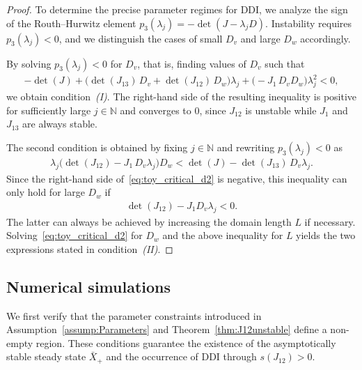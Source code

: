 \documentclass[12pt, a4paper]{amsart}
\numberwithin{equation}{section}
\newcommand{\CSS}{\bar{X}}
\begin{document}
\begin{proof}
    To determine the precise parameter regimes for DDI, we analyze the sign of the Routh--Hurwitz element $p_3(\lambda_j) = - \det(J - \lambda_j D)$. Instability requires $p_3(\lambda_j)<0$, and we distinguish the cases of small $D_v$ and large $D_w$ accordingly.
    
    By solving $p_3(\lambda_j) < 0$ for $D_v$, that is, finding values of $D_v$ such that
    \begin{align}
    -\det(J) + \biggl( \det(J_{13})\,D_v + \det(J_{12}) \,D_w \biggr) \lambda_j + \biggl( -J_1\, D_v D_w \biggr) \lambda_j^2 < 0,
    \end{align}
    we obtain condition~\emph{(I)}.  
    The right-hand side of the resulting inequality is positive for sufficiently large $j \in \mathbb{N}$ and converges to $0$, since $J_{12}$ is unstable while $J_1$ and $J_{13}$ are always stable.

    The second condition is obtained by fixing $j \in \mathbb{N}$ and rewriting $p_3(\lambda_j) < 0$ as
    \begin{align}
    \label{eq:toy_critical_d2}
        \lambda_j \big( \det(J_{12}) - J_1\, D_v \lambda_j \big) D_w 
        < \det(J) - \det(J_{13})\,D_v \lambda_j.
    \end{align}
    Since the right-hand side of~\eqref{eq:toy_critical_d2} is negative, this inequality can only hold for large $D_w$ if
    \begin{align}
        \det(J_{12}) - J_1 D_v \lambda_j < 0.
    \end{align}
    The latter can always be achieved by increasing the domain length $L$ if necessary. 
    Solving~\eqref{eq:toy_critical_d2} for $D_w$ and the above inequality for $L$ yields the two expressions stated in condition~\emph{(II)}.
\end{proof}

\subsection{Numerical simulations}
We first verify that the parameter constraints introduced in Assumption~\ref{assump:Parameters} and Theorem~\ref{thm:J12unstable} define a non-empty region. These conditions guarantee the existence of the asymptotically stable steady state $\CSS_+$ and the occurrence of DDI through $s(J_{12}) > 0$.
\end{document}
